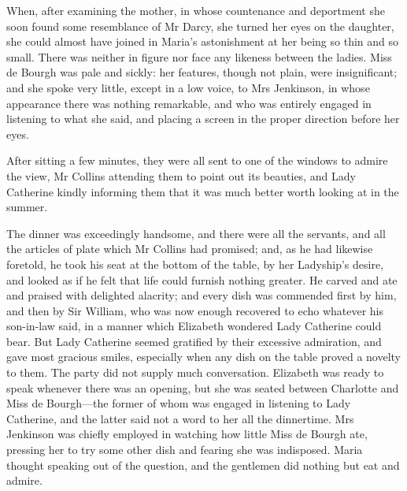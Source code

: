 When, after examining the mother, in whose countenance and deportment she soon found some resemblance of Mr Darcy, she turned her eyes on the daughter, she could almost have joined in Maria's astonishment at her being so thin and so small. There was neither in figure nor face any likeness between the ladies. Miss de Bourgh was pale and sickly: her features, though not plain, were insignificant; and she spoke very little, except in a low voice, to Mrs Jenkinson, in whose appearance there was nothing remarkable, and who was entirely engaged in listening to what she said, and placing a screen in the proper direction before her eyes.

After sitting a few minutes, they were all sent to one of the windows to admire the view, Mr Collins attending them to point out its beauties, and Lady Catherine kindly informing them that it was much better worth looking at in the summer.

The dinner was exceedingly handsome, and there were all the servants, and all the articles of plate which Mr Collins had promised; and, as he had likewise foretold, he took his seat at the bottom of the table, by her Ladyship's desire, and looked as if he felt that life could furnish nothing greater. He carved and ate and praised with delighted alacrity; and every dish was commended first by him, and then by Sir William, who was now enough recovered to echo whatever his son-in-law said, in a manner which Elizabeth wondered Lady Catherine could bear. But Lady Catherine seemed gratified by their excessive admiration, and gave most gracious smiles, especially when any dish on the table proved a novelty to them. The party did not supply much conversation. Elizabeth was ready to speak whenever there was an opening, but she was seated between Charlotte and Miss de Bourgh—the former of whom was engaged in listening to Lady Catherine, and the latter said not a word to her all the dinnertime. Mrs Jenkinson was chiefly employed in watching how little Miss de Bourgh ate, pressing her to try some other dish and fearing she was indisposed. Maria thought speaking out of the question, and the gentlemen did nothing but eat and admire.


